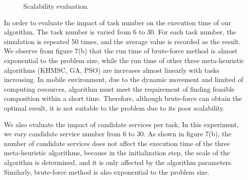 \documentclass[10pt,journal,compsoc]{IEEEtran}
\begin{document}
\begin{figure}[!t]
\centering
{}
\hfil
{}

\caption{Scalability evaluation.} \label{fig_sim}
\end{figure}

In order to evaluate the impact of task number on the execution time of our algorithm, The task number is varied from 6 to 30. For each task number, the simulation is repeated 50 times, and the average value is recorded as the result. We observe from figure 7(b) that the run time of brute-force method is almost exponential to the problem size, while the run time of other three meta-heuristic algorithms (KHMSC, GA, PSO) are increases almost linearly with tasks increasing. In mobile environment, due to the dynamic movement and limited of computing resources, algorithm must meet the requirement of finding feasible composition within a short time. Therefore, although brute-force can obtain the optimal result, it is not suitable to the problem due to its poor scalability. 

We also evaluate the impact of candidate services per task, In this experiment, we vary candidate service number from 6 to 30. As shown in figure 7(b), the number of candidate services does not affect the execution time of the three meta-heuristic algorithms, because in the initialization step, the scale of the algorithm is determined, and it is only affected by the algorithm parameters. Similarly, brute-force method is also exponential to the problem size. 
\end{document}
